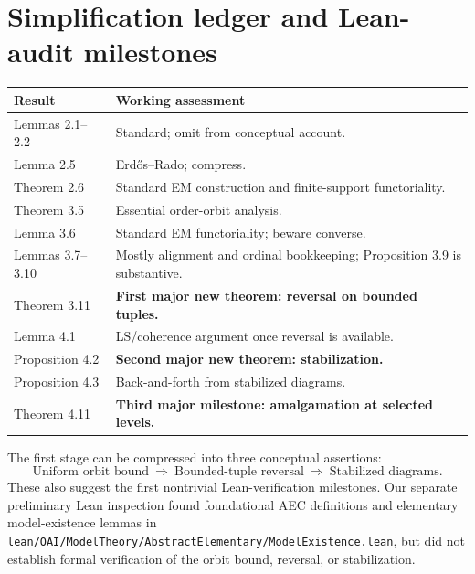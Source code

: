\documentclass[11pt]{article}
\theoremstyle{plain}
\begin{document}
\section{Simplification ledger and Lean-audit milestones}
\begin{longtable}{@{}p{}p{}@{}}
\toprule
\textbf{Result} & \textbf{Working assessment}\\\midrule
\endhead
Lemmas 2.1--2.2 & Standard; omit from conceptual account.\\
Lemma 2.5 & Erd\H{o}s--Rado; compress.\\
Theorem 2.6 & Standard EM construction and finite-support functoriality.\\
Theorem 3.5 & Essential order-orbit analysis.\\
Lemma 3.6 & Standard EM functoriality; beware converse.\\
Lemmas 3.7--3.10 & Mostly alignment and ordinal bookkeeping; Proposition 3.9 is substantive.\\
Theorem 3.11 & \textbf{First major new theorem: reversal on bounded tuples.}\\
Lemma 4.1 & LS/coherence argument once reversal is available.\\
Proposition 4.2 & \textbf{Second major new theorem: stabilization.}\\
Proposition 4.3 & Back-and-forth from stabilized diagrams.\\
Theorem 4.11 & \textbf{Third major milestone: amalgamation at selected levels.}\\
\bottomrule
\end{longtable}

The first stage can be compressed into three conceptual assertions:
\[
\boxed{\text{Uniform orbit bound}\ \Longrightarrow\ \text{Bounded-tuple reversal}\ \Longrightarrow\ \text{Stabilized diagrams}.}
\]
These also suggest the first nontrivial Lean-verification milestones. Our separate preliminary Lean inspection found foundational AEC definitions and elementary model-existence lemmas in \texttt{lean/OAI/ModelTheory/AbstractElementary/ModelExistence.lean}, but did not establish formal verification of the orbit bound, reversal, or stabilization.





\end{document}
